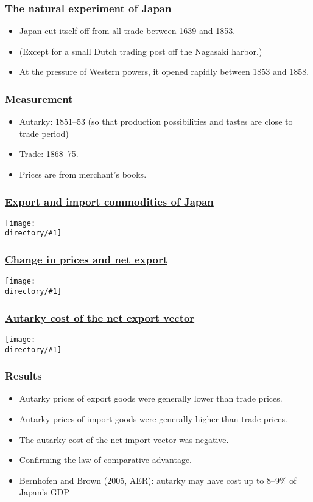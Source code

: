 \documentclass[compress,mathserif,aspectratio=169]{beamer}
\newcommand{\directory}{figures}
\newcommand{\widefigure}[2]{\begin{frame}\frametitle{\hyperlink{#1back}{#2}}\hypertarget{#1}{{\begin{center}\texttt{[image: \\directory/\#1]}\end{center}}}\end{frame}}
\newcommand{\longfigure}[2]{\begin{frame}\frametitle{\hyperlink{#1back}{#2}}\hypertarget{#1}{{\begin{center}\texttt{[image: \\directory/\#1]}\end{center}}}\end{frame}}
\begin{document}
\begin{frame}\frametitle{The natural experiment of Japan}\hypertarget{The natural experiment of Japan}{}
\begin{itemize}
\item Japan cut itself off from all trade between 1639 and 1853.

\item (Except for a small Dutch trading post off the Nagasaki harbor.)

\item At the pressure of Western powers, it opened rapidly between 1853 and 1858.


\end{itemize}
\end{frame}



\begin{frame}\frametitle{Measurement}\hypertarget{Measurement}{}
\begin{itemize}
\item Autarky: 1851--53 (so that production possibilities and tastes are close to trade period)

\item Trade: 1868--75.

\item Prices are from merchant's books.


\end{itemize}
\end{frame}




\longfigure{japan-trade}{Export and import commodities of Japan}
\longfigure{autarky-prices}{Change in prices and net export}
\widefigure{lawofca}{Autarky cost of the net export vector}


\begin{frame}\frametitle{Results}\hypertarget{Results}{}
\begin{itemize}
\item Autarky prices of export goods were generally lower than trade prices.

\item Autarky prices of import goods were generally higher than trade prices.

\item The autarky cost of the net import vector was negative.

\item Confirming the law of comparative advantage.

\item Bernhofen and Brown (2005, AER): autarky may have cost up to 8--9\% of Japan's GDP


\end{itemize}
\end{frame}
\end{document}
